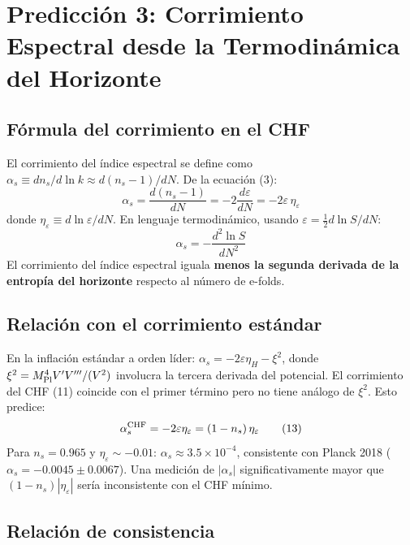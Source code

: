 \documentclass[12pt,a4paper]{article}
\begin{document}
\section{Predicción 3: Corrimiento Espectral desde la Termodinámica del Horizonte}

\subsection{Fórmula del corrimiento en el CHF}

El corrimiento del índice espectral se define como $\alpha_s \equiv dn_s/d\ln k \approx d(n_s-1)/dN$. De la ecuación (3):
\begin{equation}
\alpha_s = \frac{d(n_s-1)}{dN} = -2\frac{d\varepsilon}{dN} = -2\varepsilon\,\eta_\varepsilon \tag{11}
\end{equation}
donde $\eta_\varepsilon \equiv d\ln\varepsilon/dN$. En lenguaje termodinámico, usando $\varepsilon = \frac{1}{2}d\ln S/dN$:
\begin{equation}
\alpha_s = -\frac{d^2\ln S}{dN^2} \tag{12}
\end{equation}
El corrimiento del índice espectral iguala \textbf{menos la segunda derivada de la entropía del horizonte} respecto al número de e-folds.

\subsection{Relación con el corrimiento estándar}

En la inflación estándar a orden líder: $\alpha_s = -2\varepsilon\eta_H - \xi^2$, donde $\xi^2 = M_{\rm Pl}^4 V'V'''/(V^2)$ involucra la tercera derivada del potencial. El corrimiento del CHF (11) coincide con el primer término pero no tiene análogo de $\xi^2$. Esto predice:
\begin{equation}
\alpha_s^{\rm CHF} = -2\varepsilon\eta_\varepsilon = (1-n_s)\,\eta_\varepsilon \tag{13}
\end{equation}
Para $n_s = 0.965$ y $\eta_\varepsilon \sim -0.01$: $\alpha_s \approx 3.5\times10^{-4}$, consistente con Planck 2018 ($\alpha_s = -0.0045 \pm 0.0067$). Una medición de $|\alpha_s|$ significativamente mayor que $(1-n_s)|\eta_\varepsilon|$ sería inconsistente con el CHF mínimo.

\subsection{Relación de consistencia}
\end{document}

